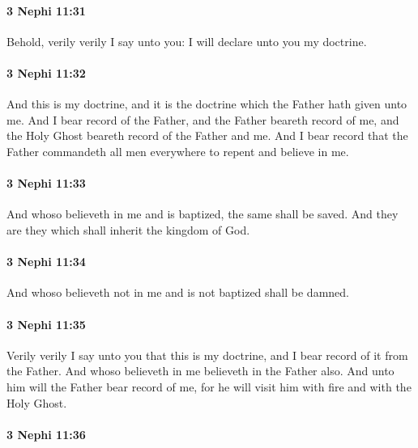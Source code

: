 		\paragraph{3 Nephi 11:31} %
			\label{3NEPHI-11-31}

			Behold, verily verily I say unto you:
			I will declare unto you my doctrine.

		\paragraph{3 Nephi 11:32} %
			\label{3NEPHI-11-32}

			And this is my doctrine,
			and it is the doctrine which the Father hath given unto me.
			And I bear record of the Father,
			and the Father beareth record of me,
			and the Holy Ghost beareth record of the Father and me.
			And I bear record that the Father commandeth all men everywhere
			to repent and believe in me.

		\paragraph{3 Nephi 11:33} %
			\label{3NEPHI-11-33}

			And whoso believeth in me and is baptized, the same shall be saved.
			And they are they which shall inherit the kingdom of God.

		\paragraph{3 Nephi 11:34} %
			\label{3NEPHI-11-34}

			And whoso believeth not in me and is not baptized shall be damned.

		\paragraph{3 Nephi 11:35} %
			\label{3NEPHI-11-35}

			Verily verily I say unto you that this is my doctrine,
			and I bear record of it from the Father.
			And whoso believeth in me believeth in the Father also.
			And unto him will the Father bear record of me,
			for he will visit him with fire and with the Holy Ghost.

		\paragraph{3 Nephi 11:36} %
			\label{3NEPHI-11-36}

